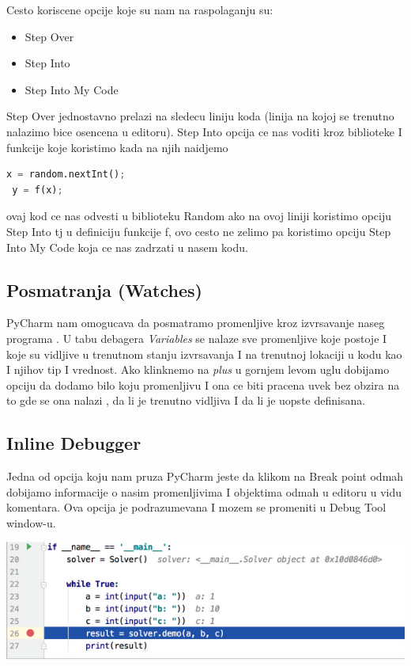 \documentclass[a4paper]{article}
\begin{document}
Cesto koriscene opcije koje su nam na raspolaganju su:
\begin{itemize}
\item  Step Over
\item  Step Into
\item Step Into My Code
\end{itemize}
Step Over jednostavno prelazi na sledecu liniju koda (linija na kojoj se trenutno nalazimo bice osencena u editoru). Step Into opcija ce nas voditi kroz biblioteke I funkcije koje koristimo kada na njih naidjemo
\begin{lstlisting}[language = Python, caption={Primer neki}]
 x = random.nextInt();
 y = f(x);
\end{lstlisting} 
 ovaj kod ce nas odvesti u biblioteku Random ako na ovoj liniji koristimo opciju Step Into tj u definiciju funkcije f, ovo cesto ne zelimo pa koristimo opciju Step Into My Code koja ce nas zadrzati u nasem kodu. 
\subsection{Posmatranja (Watches)}
PyCharm nam omogucava da posmatramo promenljive kroz izvrsavanje naseg programa . U tabu debagera \emph{Variables} se nalaze sve promenljive koje postoje I koje su vidljive u trenutnom stanju izvrsavanja I na trenutnoj lokaciji u kodu  kao I njihov tip I vrednost. Ako klinknemo na \emph {plus} u gornjem levom uglu dobijamo opciju da dodamo bilo koju promenljivu I ona ce biti pracena uvek bez obzira na to gde se ona nalazi , da li je trenutno vidljiva I da li je uopste definisana.
\subsection{Inline Debugger}
Jedna od opcija koju nam pruza PyCharm jeste da klikom na Break point odmah dobijamo informacije o nasim promenljivima I objektima odmah u editoru u vidu komentara. Ova opcija je podrazumevana I mozem se promeniti u Debug Tool window-u.


\includegraphics[scale = 0.4]{3}
\end{document}
